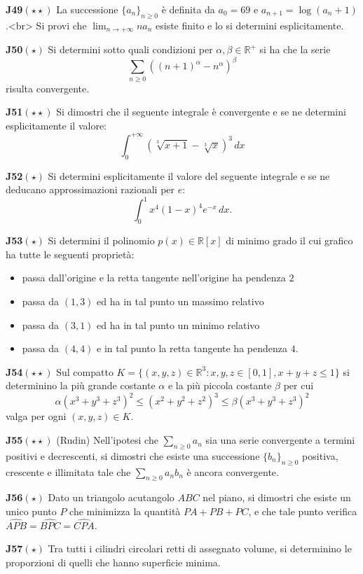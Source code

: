 \documentclass[a4paper,twoside]{article}
\theoremstyle{definition}
\numberwithin{theorem}{section}
\begin{document}
\textbf{J49}$(\star\star)$ La successione $\{a_n\}_{n\geq 0}$ è definita da $a_0=69$ e $a_{n+1}=\log(a_n+1)$.<br> Si provi che $\lim_{n\to +\infty} na_n$ esiste finito e lo si determini esplicitamente. 

\textbf{J50}$(\star)$ Si determini sotto quali condizioni per $\alpha,\beta\in\mathbb{R}^+$ si ha che la serie
$$ \sum_{n\geq 0}\left((n+1)^\alpha-n^\alpha\right)^\beta $$
risulta convergente.

\textbf{J51}$(\star\star)$ Si dimostri che il seguente integrale è convergente e se ne determini esplicitamente il valore:
$$ \int_{0}^{+\infty}\left(\sqrt[3]{x+1}-\sqrt[3]{x}\right)^3\,dx $$

\textbf{J52}$(\star)$ Si determini esplicitamente il valore del seguente integrale e se ne deducano approssimazioni razionali per $e$: $$\int_{0}^{1}x^4(1-x)^4 e^{-x}\,dx. $$

\textbf{J53}$(\star)$ Si determini il polinomio $p(x)\in\mathbb{R}[x]$ di minimo grado il cui grafico ha tutte le seguenti proprietà:
\begin{itemize}
\item passa dall'origine e la retta tangente nell'origine ha pendenza $2$
\item passa da $(1,3)$ ed ha in tal punto un massimo relativo
\item passa da $(3,1)$ ed ha in tal punto un minimo relativo
\item passa da $(4,4)$ e in tal punto la retta tangente ha pendenza $4$.
\end{itemize}
\textbf{J54}$(\star\star)$ Sul compatto $K=\{(x,y,z)\in\mathbb{R}^3: x,y,z\in[0,1], x+y+z\leq 1\}$ si determinino la più grande costante $\alpha$ e la più piccola costante $\beta$ per cui
$$\alpha (x^3+y^3+z^3)^2\leq  (x^2+y^2+z^2)^3 \leq \beta (x^3+y^3+z^3)^2$$
valga per ogni $(x,y,z)\in K$.

\textbf{J55}$(\star\star)$ (Rudin) Nell'ipotesi che $\sum_{n\geq 0}a_n$ sia una serie convergente a termini positivi e decrescenti, si dimostri che esiste una successione $\{b_n\}_{n\geq 0}$ positiva, crescente e illimitata tale che $\sum_{n\geq 0}a_n b_n$ è ancora convergente.

\textbf{J56}$(\star)$ Dato un triangolo acutangolo $ABC$ nel piano, si dimostri che esiste un unico punto $P$ che minimizza la quantità $PA+PB+PC$, e che tale punto verifica $\widehat{APB}=\widehat{BPC}=\widehat{CPA}$.

\textbf{J57}$(\star)$ Tra tutti i cilindri circolari retti di assegnato volume, si determinino le proporzioni di quelli che hanno superficie minima.
\end{document}
